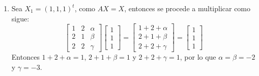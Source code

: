 \begin{solucion}
 $\phantom{0}$
 \begin{enumerate}[$a$)]
  \item Sea $X_1 = (1,1,1)^t$, como $AX=X$, entonces se procede a multiplicar como sigue:
  \begin{equation*}
   \begin{bmatrix}
    1 & 2 & \alpha \\
    2 & 1 & \beta  \\
    2 & 2 & \gamma 
   \end{bmatrix}
   \begin{bmatrix}
    1 \\ 1 \\ 1
   \end{bmatrix}
   =
   \begin{bmatrix}
    1 + 2 + \alpha \\
    2 + 1 + \beta  \\
    2 + 2 + \gamma
   \end{bmatrix}
   =
   \begin{bmatrix}
    1 \\ 1 \\ 1
   \end{bmatrix}
  \end{equation*}
  Entonces $1+2 + \alpha = 1$, $2+1+\beta = 1$ y $2 + 2 + \gamma = 1$, por lo que $\alpha = \beta = -2$ y $\gamma = -3$.
  

\end{enumerate}
\end{solucion}
